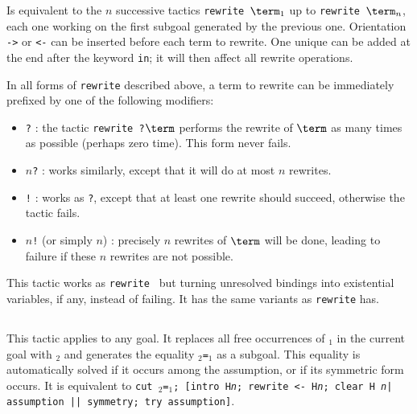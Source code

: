 \begin{Variants}
\item {}

  Is equivalent to the $n$ successive tactics {\tt rewrite $\term_1$}
  up to {\tt rewrite $\term_n$}, each one working on the first subgoal
  generated by the previous one.
  Orientation {\tt ->} or {\tt <-} can be
  inserted before each term to rewrite. One unique 
  can be added at the end after the keyword {\tt in}; it will
  then affect all rewrite operations.

\item In all forms of {\tt rewrite} described above, a term to rewrite
  can be immediately prefixed by one of the following modifiers:
  \begin{itemize}
  \item {\tt ?} : the tactic {\tt rewrite ?$\term$} performs the
    rewrite of $\term$  as many times as possible (perhaps zero time).
    This form never fails.
  \item {\tt $n$?} : works similarly, except that it will do at most
   $n$ rewrites.
  \item {\tt !} : works as {\tt ?}, except that at least one rewrite
    should succeed, otherwise the tactic fails.
  \item {\tt $n$!} (or simply {\tt $n$}) : precisely $n$ rewrites
    of $\term$ will be done, leading to failure if these $n$ rewrites are not possible.
  \end{itemize}

\item {}

This tactic works as {\tt rewrite {\term}} but turning unresolved
bindings into existential variables, if any, instead of failing. It has
the same variants as {\tt rewrite} has.

\end{Variants}

\subsection{}
\label{tactic:replace}

This tactic applies to any goal. It replaces all free occurrences of
{\term$_1$} in the current goal with {\term$_2$} and generates the
equality {\term$_2$}{\tt =}{\term$_1$} as a subgoal. This equality is
automatically solved if it occurs among the assumption, or if its
symmetric form occurs.  It is equivalent to {\tt cut
\term$_2$=\term$_1$; [intro H{\sl n}; rewrite <- H{\sl n}; clear H{\sl
n}| assumption || symmetry; try assumption]}.

